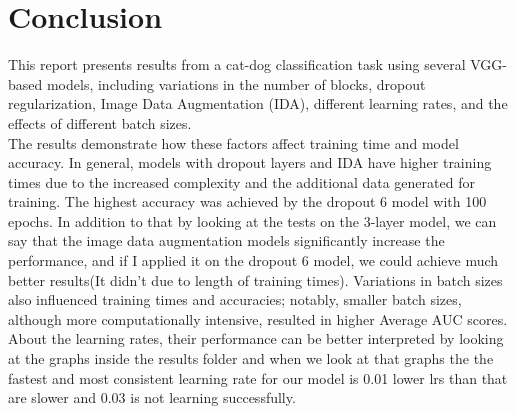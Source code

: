 \documentclass{article}
\begin{document}
\begin{center}
\end{center}



\section{Conclusion}
This report presents results from a cat-dog classification task using several VGG-based models, including variations in the number of blocks, dropout regularization, Image Data Augmentation (IDA), different learning rates, and the effects of different batch sizes.
\\  The results demonstrate how these factors affect training time and model accuracy. In general, models with dropout layers and IDA have higher training times due to the increased complexity and the additional data generated for training. The highest accuracy was achieved by the dropout 6 model with 100 epochs. In addition to that by looking at the tests on the 3-layer model, we can say that the image data augmentation models significantly increase the performance, and if I applied it on the dropout 6 model, we could achieve much better results(It didn't due to length of training times). Variations in batch sizes also influenced training times and accuracies; notably, smaller batch sizes, although more computationally intensive, resulted in higher Average AUC scores. About the learning rates, their performance can be better interpreted by looking at the graphs inside the results folder and when we look at that graphs the the fastest and most consistent learning rate for our model is 0.01 lower lrs than that are slower and 0.03 is not learning successfully. 
\end{document}
